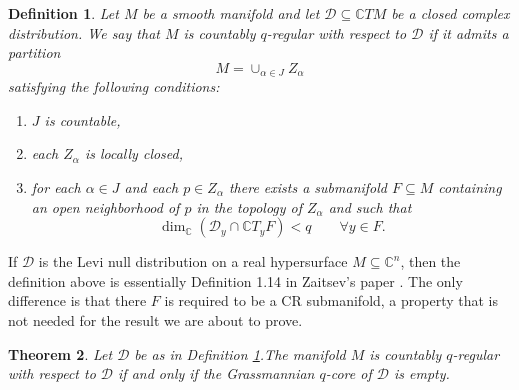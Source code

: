 \documentclass[12pt]{amsart}
\newtheorem{theorem}{Theorem}[section]
\newtheorem{definition}[theorem]{Definition}
\numberwithin{equation}{section}
{\theoremstyle{definition}
\newtheorem{remark}[theorem]{Remark}
}
\newcommand{\C}{\mathbb{C}}
\begin{document}
\begin{definition}\label{def:countable_regularity} Let $M$ be a smooth manifold and let $\mathcal{D}\subseteq \C TM$ be a closed complex distribution. We say that $M$ is \emph{countably $q$-regular with respect to $\mathcal{D}$} if it admits a partition 
\begin{equation}\label{the stratification}
M = \cup_{\alpha\in J} Z_\alpha
\end{equation} satisfying the following conditions: \begin{enumerate}
	\item $J$ is countable,	
	\item each $Z_\alpha$ is locally closed, 
	\item for each $\alpha\in J$ and each $p\in Z_\alpha$ there exists a submanifold $F\subseteq M$ containing an open neighborhood of $p$ in the topology of $Z_\alpha$ and such that \begin{equation}\label{eq:intersection<q}
		\dim_\C\left(\mathcal{D}_y\cap\C T_yF\right) <q\qquad \forall y\in F.
		\end{equation} 
\end{enumerate}
\end{definition}

If $\mathcal{D}$ is the Levi null distribution on a real hypersurface $M\subseteq \C^n$, then the definition above is essentially Definition 1.14 in Zaitsev's paper \cite{Za24}. The only difference is that there $F$ is required to be a CR submanifold, a property that is not needed for the result we are about to prove.

\begin{theorem}\label{thm:countably_regular}
Let $\mathcal{D}$ be as in Definition \ref{def:countable_regularity}.The manifold $M$ is countably $q$-regular with respect to $\mathcal{D}$ if and only if 
the Grassmannian $q$-core of $\mathcal{D}$ is empty. 
\end{theorem}
\end{document}
